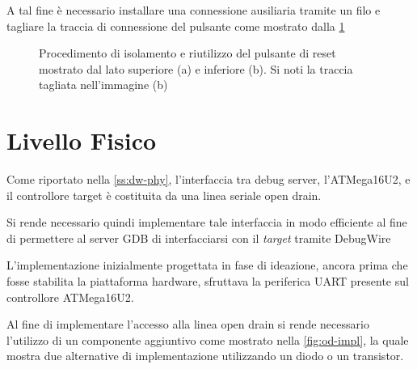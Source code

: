 A tal fine è necessario installare una connessione ausiliaria tramite un filo e tagliare la traccia di connessione del pulsante come mostrato dalla \cref{fig:rst-rewire}

\begin{figure}[h]
    \centering
    \hspace{8mm}

    \caption[]{Procedimento di isolamento e riutilizzo del pulsante di reset mostrato dal lato superiore (a) e inferiore (b). Si noti la traccia tagliata nell'immagine (b)}\label{fig:rst-rewire}
\end{figure}

\section{Livello Fisico}

Come riportato nella \cref{ss:dw-phy}, l'interfaccia tra debug server, l'ATMega16U2, e il controllore target è costituita da una linea seriale open drain.

Si rende necessario quindi implementare tale interfaccia in modo efficiente al fine di permettere al server GDB di interfacciarsi con il \textit{target} tramite DebugWire

L'implementazione inizialmente progettata in fase di ideazione, ancora prima che fosse stabilita la piattaforma hardware, sfruttava la periferica UART presente sul controllore ATMega16U2\cite[chap. 18]{avr:m16u2}.

Al fine di implementare l'accesso alla linea open drain si rende necessario l'utilizzo di un componente aggiuntivo come mostrato nella \cref{fig:od-impl}, la quale mostra due alternative di implementazione utilizzando un diodo o un transistor. 

